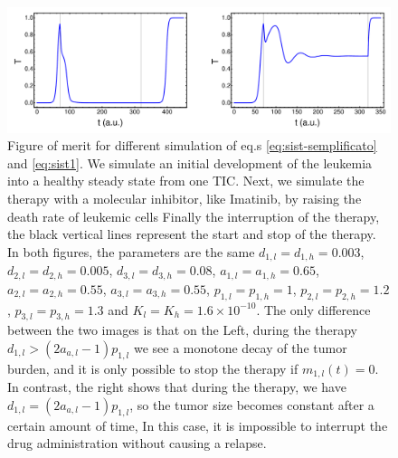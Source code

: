 \documentclass[a4paper,10pt]{article}
\begin{document}
\begin{figure}
\centering
\includegraphics[width=15cm] {esempio-unregolated.pdf}
\caption{Figure of merit for different simulation of eq.s \eqref{eq:sist-semplificato} and \eqref{eq:sist1}.
We simulate an initial development of the leukemia into a healthy steady state 
from one TIC. 
Next, we simulate the therapy with a molecular inhibitor,
like Imatinib, by raising the death rate of leukemic cells
\cite{effetto-imatinib-1, effetto-imatinib-2, effetto-imatinib-3} 
Finally the interruption of the therapy, the black vertical lines represent the start
and stop of the therapy. 
In both figures, the parameters are the same $d_{1,l}=d_{1,h}=0.003$, $d_{2,l}=d_{2,h}=0.005$,
$d_{3,l}=d_{3,h}=0.08$, $a_{1,l}=a_{1,h}=0.65$, $a_{2,l}=a_{2,h}=0.55$, 
$a_{3,l}=a_{3,h}=0.55$, $p_{1,l}=p_{1,h}=1$, $p_{2,l}=p_{2,h}=1.2$,
$p_{3,l}=p_{3,h}=1.3$ and $K_{l}=K_{h}=1.6\times 10^{-10}$. 
The only difference between the two images is that on the
Left, during the therapy $d_{1,l}>(2a_{a,l}-1)p_{1,l}$ we see a monotone 
decay of the tumor burden, and it is only possible to stop the therapy if $m_{1,l}(t)=0$. 
In contrast, the right shows that during the therapy, we have $d_{1,l}=(2a_{a,l}-1)p_{1,l}$, so the tumor size becomes constant after a certain amount of time, 
In this case, it is impossible to interrupt the drug administration without causing a relapse.\\
} 
\label{fig:model1}
\end{figure}

\FloatBarrier
\end{document}
